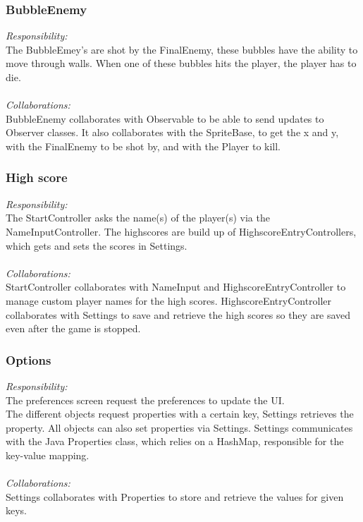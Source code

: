\subsubsection{BubbleEnemy}
\textit{Responsibility:} \\
The BubbleEmey's are shot by the FinalEnemy, these bubbles have the ability to move through walls. When one of these bubbles hits the player, the player has to die. \\ \\
\textit{Collaborations:} \\
BubbleEnemy collaborates with Observable to be able to send updates to Observer classes. It also collaborates with  the SpriteBase, to get the x and y, with the FinalEnemy to be shot by, and with the Player to kill.

\subsubsection{High score}
\textit{Responsibility:} \\
The StartController asks the name(s) of the player(s) via the NameInputController. The highscores are build up of HighscoreEntryControllers, which gets and sets the scores in Settings. \\ \\
\textit{Collaborations:} \\
StartController collaborates with NameInput and HighscoreEntryController to manage custom player names for the high scores. HighscoreEntryController collaborates with Settings to save and retrieve the high scores so they are saved even after the game is stopped.

\subsubsection{Options}
\textit{Responsibility:} \\
The preferences screen request the preferences to update the UI. \\
The different objects request properties with a certain key, Settings retrieves the property. All objects can also set properties via Settings. Settings communicates with the Java Properties class, which relies on a HashMap, responsible for the key-value mapping. \\ \\
\textit{Collaborations:} \\
Settings collaborates with Properties to store and retrieve the values for given keys.

